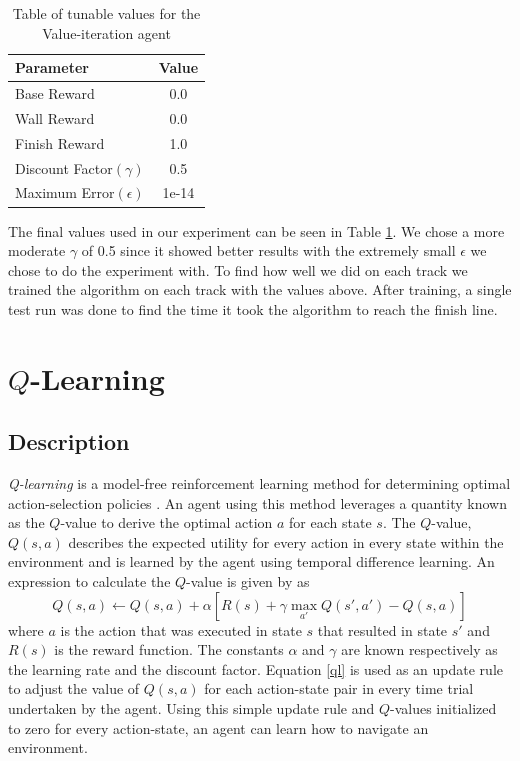 \documentclass{article}
\begin{document}
	\begin{table}
		\centering
		\begin{tabular}{|l|c|}
			\hline
			Parameter & Value \\ \hline
			Base Reward & 0.0 \\ 
			Wall Reward & 0.0 \\
			Finish Reward & 1.0 \\
			Discount Factor$(\gamma)$ & 0.5 \\
			Maximum Error$(\epsilon)$ & 1e-14 \\ \hline
		\end{tabular}
		\caption{Table of tunable values for the Value-iteration agent}
		\label{stuff}
	\end{table}
	The final values used in our experiment can be seen in Table \ref{stuff}. We chose a more moderate $\gamma$ of 0.5 since it showed better results with the extremely small $\epsilon$ we chose to do the experiment with. To find how well we did on each track we trained the algorithm on each track with the values above. After training, a single test run was done to find the time it took the algorithm to reach the finish line. 
	\section{$Q$-Learning}
		\subsection{Description}
			\textit{Q-learning} is a model-free reinforcement learning method for determining optimal action-selection policies \cite{ai}. An agent using this method leverages a quantity known as the $Q$-value to derive the optimal action $a$ for each state $s$. The $Q$-value, $Q(s,a)$ describes the expected utility for every action in every state within the environment and is learned by the agent using temporal difference learning.
			An expression to calculate the $Q$-value is given by \cite{ai} as
			\begin{equation}
				Q(s,a) \leftarrow Q(s,a) + \alpha \left[ R(s) + \gamma \max_{a'} Q(s',a') - Q(s,a) \right]
				\label{ql}
			\end{equation}
			where $a$ is the action that was executed in state $s$ that resulted in state $s'$ and $R(s)$ is the reward function. The constants $\alpha$ and $\gamma$ are known respectively as the learning rate and the discount factor. Equation \ref{ql} is used as an update rule to adjust the value of $Q(s,a)$ for each action-state pair in every time trial undertaken by the agent. Using this simple update rule and $Q$-values initialized to zero for every action-state, an agent can learn how to navigate an environment.
\end{document}

